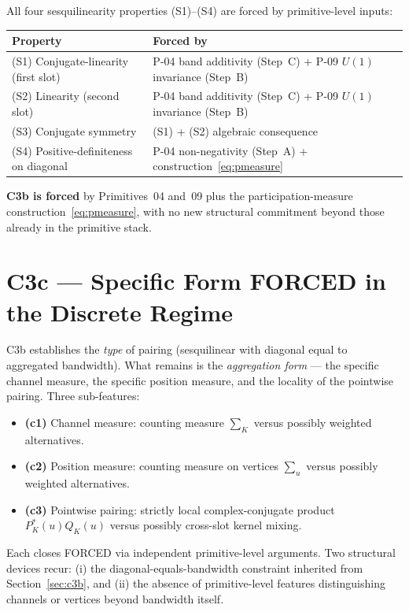 \documentclass[11pt,a4paper]{article}
\begin{document}
All four sesquilinearity properties (S1)--(S4) are forced by primitive-level inputs:

\begin{center}
\begin{tabular}{ll}
\hline
Property & Forced by \\
\hline
(S1) Conjugate-linearity (first slot) & P-04 band additivity (Step~C) + P-09 $U(1)$ invariance (Step~B) \\
(S2) Linearity (second slot) & P-04 band additivity (Step~C) + P-09 $U(1)$ invariance (Step~B) \\
(S3) Conjugate symmetry & (S1) + (S2) algebraic consequence \\
(S4) Positive-definiteness on diagonal & P-04 non-negativity (Step~A) + construction~\eqref{eq:pmeasure} \\
\hline
\end{tabular}
\end{center}

\textbf{C3b is forced} by Primitives~04 and~09 plus the participation-measure construction~\eqref{eq:pmeasure}, with no new structural commitment beyond those already in the primitive stack.

\section{C3c --- Specific Form FORCED in the Discrete Regime}\label{sec:c3c}

C3b establishes the \emph{type} of pairing (sesquilinear with diagonal equal to aggregated bandwidth). What remains is the \emph{aggregation form} --- the specific channel measure, the specific position measure, and the locality of the pointwise pairing. Three sub-features:

\begin{itemize}
  \item \textbf{(c1)} Channel measure: counting measure $\sum_K$ versus possibly weighted alternatives.
  \item \textbf{(c2)} Position measure: counting measure on vertices $\sum_u$ versus possibly weighted alternatives.
  \item \textbf{(c3)} Pointwise pairing: strictly local complex-conjugate product $P_K^*(u) Q_K(u)$ versus possibly cross-slot kernel mixing.
\end{itemize}

Each closes FORCED via independent primitive-level arguments. Two structural devices recur: (i) the diagonal-equals-bandwidth constraint inherited from Section~\ref{sec:c3b}, and (ii) the absence of primitive-level features distinguishing channels or vertices beyond bandwidth itself.
\end{document}
